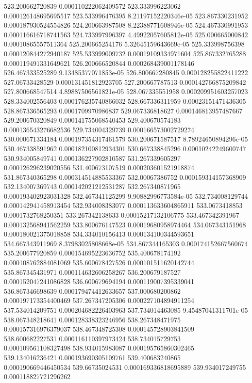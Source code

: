 {523.200662720839 0.000110222062409572
523.333996223062 0.000126148695695517
523.533996476395 8.21197152220346e-05
523.867330231952 0.000187930524554826
524.200663987508 8.22388771608946e-05
524.467330991953 0.000116616718741563
524.733997996397 4.49922057605812e-05
525.000665000842 0.00010865557511364
525.200665254176 5.32645159643669e-05
525.333998756398 0.000120844272940187
525.533999009732 0.00019109334971604
525.867332765288 0.000119491331649621
526.200666520844 0.000268439001178146
526.467333525289 9.13485377071853e-05
526.800667280845 0.000128255822411222
527.06733428529 0.000131451812923705
527.200667787513 0.000142766875209842
527.800668547514 4.89887506561821e-05
528.067335551958 0.000209951603257023
528.334002556403 0.000176235740866032
528.667336311959 0.00023151471436305
528.867336565293 0.0001709970986837
529.067336818627 0.000146813957487667
529.200670320849 0.000141755068540453
529.400670574183 0.000136543276682536
529.734004329739 0.000166573002729274
530.000671334184 0.000197354317461579
530.200671587517 8.78924650894296e-05
530.467338591962 0.000182100812934301
530.667338845296 0.00010242249600747
530.934005849741 0.000136227902810587
531.267339605297 0.000126296239020556
531.400673107519 0.000203601521918874
531.867340365298 0.000314514885533367
532.00067386752 0.000159314157368909
532.134007369743 0.000142021212531287
532.267340871965 0.000193402923031328
532.467341125299 9.90882996773584e-05
532.734008129744 0.000142941458913454
532.934008383077 0.000113633604865911
533.0673418853 0.0001732768250351
533.267342138633 0.00015217132106775
533.467342391967 0.000132568941562259
533.800676147523 0.00019680958974464
534.067343151968 0.000180021375018858
534.334010156413 0.000134100344593651
534.667343911969 8.37983025808668e-05
534.867344165303 0.000174152667560674
535.200677920859 0.000154695223636752
535.400678174192 0.000108762884081069
535.600678427526 0.000101511620142744
535.867345431971 0.000114632606258267
536.200679187527 0.000152047241086828
536.600679694194 0.000119007395339041
536.867346698639 0.000179474412633657
537.000680200862 0.000197173354400469
537.267347205306 0.000227104894911254
537.534014209751 0.000204682226403963
537.734014463085 9.45487041311701e-05
538.067348218641 0.000128338323246956
538.267348471975 0.000157316976379037
538.467348725308 0.000145728903841509
538.600682227531 0.000116110397973424
538.734015729753 0.000109561108327498
538.934015983087 0.000195765860302465
539.134016236421 0.000193690305109761
539.400683240865 0.000190669446450534
539.66735024531 0.000169336818695889
539.934017249755 0.000118827721296262
}
